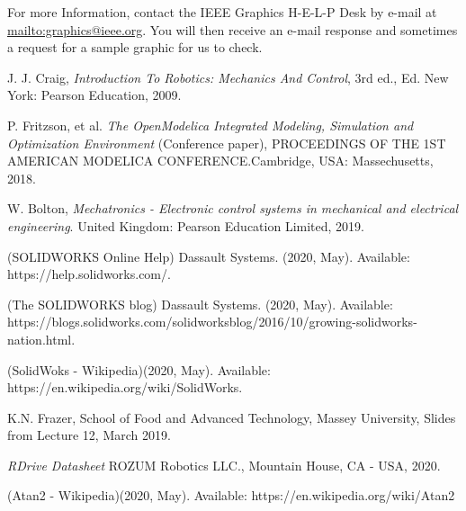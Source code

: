\documentclass[transmag]{IEEEtran}
\begin{document}
For more Information, contact the IEEE Graphics H-E-L-P Desk by e-mail at 
\href {mailto:graphics@ieee.org}{mailto:graphics@ieee.org}. You will then receive an e-mail response and 
sometimes a request for a sample graphic for us to check.


\clearpage
\newpage

\begin{thebibliography}{00}
 J. J. Craig, \emph{Introduction To Robotics: Mechanics And Control}, 3rd ed., Ed. New York: Pearson Education, 2009.

 P. Fritzson, et al. \emph{The OpenModelica Integrated Modeling, Simulation and Optimization Environment} (Conference paper), PROCEEDINGS OF THE 1ST AMERICAN MODELICA CONFERENCE$. $Cambridge, USA: Massechusetts, 2018.

 W. Bolton, \emph{Mechatronics - Electronic control systems in mechanical and electrical engineering}. United Kingdom: Pearson Education Limited, 2019.

 (SOLIDWORKS Online Help) Dassault Systems. (2020, May).  Available: https://help.solidworks.com/.

 (The SOLIDWORKS blog) Dassault Systems. (2020, May).  Available: https://blogs.solidworks.com/solidworksblog/2016/10/growing-solidworks-nation.html.

 (SolidWoks - Wikipedia)(2020, May). Available: https://en.wikipedia.org/wiki/SolidWorks. 

 K.N. Frazer, School of Food and Advanced Technology, Massey University, Slides from Lecture 12, March 2019.

 \emph{RDrive Datasheet} ROZUM Robotics LLC., Mountain House, CA - USA, 2020.

 (Atan2 - Wikipedia)(2020, May). Available: https://en.wikipedia.org/wiki/Atan2
\end{thebibliography}



\clearpage
\newpage


\appendix
\label{appendix-A}




\end{document}
